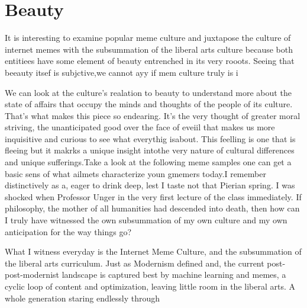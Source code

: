 \documentclass[12pt,letterpaper]{article}
\newif\ifdraft
\begin{document}
\section{Beauty}
It is interesting to examine popular meme culture and juxtapose the culture of internet memes with the subsummation of the liberal arts culture because both entitiees have some element of beauty entrenched in its very rooots.  Seeing that beeauty itsef is subjctive,we  cannot ayy if mem culture truly is i%

We can look at the culture's realation to beauty to understand more about the state of affairs that occupy the minds and thoughts of the people of its  culture. That's what makes this piece so endearing.  It's the very thought of greater moral striving, the unanticipated good over the face of eveiil that makes  us more inquisitive and curious to see what everythig isabout.  This feelling is one that is fleeing but it makrks a unique insight intothe very nature of cultural differences and unique sufferings.Take a look at the following  meme samples one can get a basic sens of what  ailmets characterize youn gmemers today.I remember distinctively as a, eager to drink deep, lest I taste not that Pierian spring.  I was shocked when Professor Unger in the very first lecture of the class immediately.  If philosophy, the mother of all humanities had descended into death, then how can I truly have witnessed the own subsummation of my own culture and my own anticipation for the way things go?

 What I witness everyday is the Internet Meme Culture, and the subsummation of the liberal arts curriculum.  Just as Modernism defined and, the current post-post-modernist landscape is captured best by machine learning and memes, a cyclic loop of content and optimization, leaving little room in the liberal arts.  A whole generation staring endlessly through 




\ifdraft
My class schedule this entire semester had taken on an interesting flavor -- it was going to be taught.  The benefits of, it's like growing up with two parents who aren't divorced.


I can name of few dynamic duels that I know off -- Joe Blitzstein and Susan Murphy in the Statistics Department, James Mickens and Eddie Kohler in the CS department, whose operating systems class starts at three that very same day.
  \fi
\end{document}
